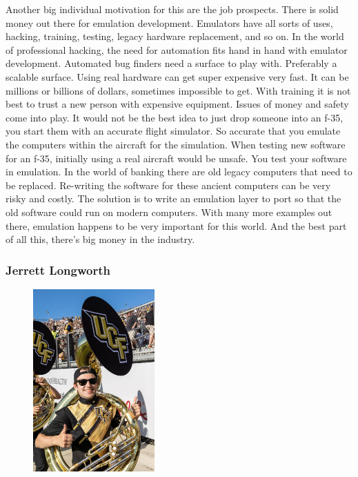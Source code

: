 \documentclass[
    paper=letter,
    parskip=half,
    fontsize=12pt,
    titlepage=firstiscover,
    toc=bibliography,
    numbers=endperiod
]{scrartcl}
\begin{document}
Another big individual motivation for this are the job prospects. There is solid money out there for emulation development. Emulators have all sorts of uses, hacking, training, testing, legacy hardware replacement, and so on. In the world of professional hacking, the need for automation fits hand in hand with emulator development. Automated bug finders need a surface to play with. Preferably a scalable surface. Using real hardware can get super expensive very fast. It can be millions or billions of dollars, sometimes impossible to get. With training it is not best to trust a new person with expensive equipment. Issues of money and safety come into play. It would not be the best idea to just drop someone into an f-35, you start them with an accurate flight simulator. So accurate that you emulate the computers within the aircraft for the simulation. When testing new software for an f-35, initially using a real aircraft would be unsafe. You test your software in emulation. In the world of banking there are old legacy computers that need to be replaced. Re-writing the software for these ancient computers can be very risky and costly. The solution is to write an emulation layer to port so that the old software could run on modern computers. With many more examples out there, emulation happens to be very important for this world. And the best part of all this, there's big money in the industry.


\subsubsection{Jerrett Longworth}
\begin{figure}[H]
    \includegraphics[height=7cm]{profile-jerrett}
\end{figure}
\end{document}

